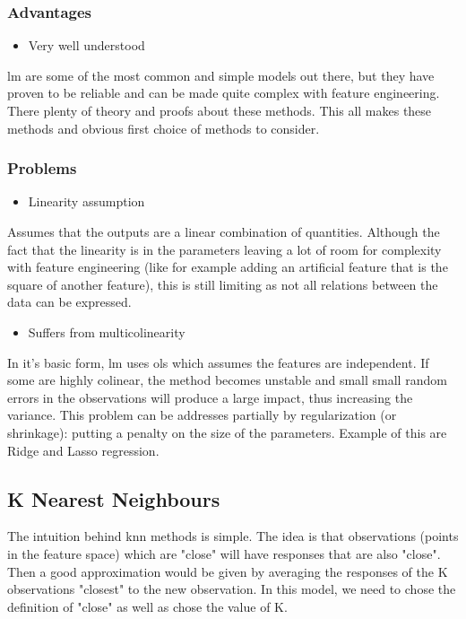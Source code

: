 \subsubsection{Advantages}
\begin{itemize}
\item Very well understood
\end{itemize}

\acrlong{lm} are some of the most common and simple models out there, but they have proven to be reliable and can be made quite complex with feature engineering. There plenty of theory and proofs about these methods. This all makes these methods and obvious first choice of methods to consider.
\subsubsection{Problems}
\begin{itemize}
\item Linearity assumption
\end{itemize}
Assumes that the outputs are a linear combination of quantities. Although the fact that the linearity is in the parameters leaving a lot of room for complexity with feature engineering (like for example adding an artificial feature that is the square of another feature), this is still limiting as not all relations between the data can be expressed.
\begin{itemize}
\item Suffers from multicolinearity 
\end{itemize}
In it's basic form, \acrlong{lm} uses \acrfull{ols} which assumes the features are independent. If some are highly colinear, the method becomes unstable and small small random errors in the observations will produce a large impact, thus increasing the variance. This problem can be addresses partially by regularization (or shrinkage): putting a penalty on the size of the parameters. Example of this are Ridge and Lasso regression.

\subsection{K Nearest Neighbours}
The intuition behind \acrshort{knn} methods is simple. The idea is that observations (points in the feature space) which are "close" will have responses that are also "close". Then a good approximation would be given by averaging the responses of the K observations "closest" to the new observation.
In this model, we need to chose the definition of "close" as well as chose the value of K.

